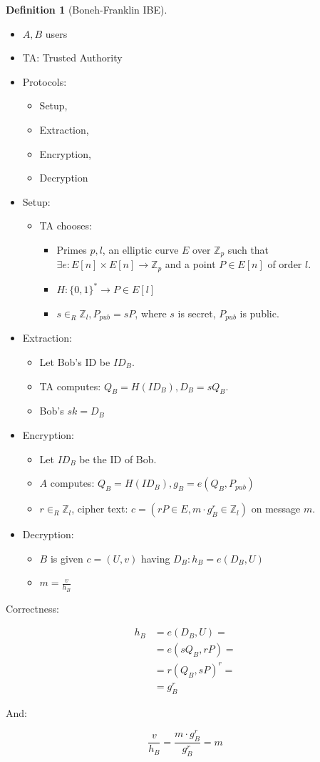 \documentclass[11pt]{article}
\theoremstyle{definition}
\newtheorem{definition}{Definition}[section]
\theoremstyle{proof}
\begin{document}
\begin{definition}[Boneh-Franklin IBE]\leavevmode
	\begin{itemize}
		\item $A, B$ users
		\item TA: Trusted Authority
		\item Protocols:
		\begin{itemize}
			\item Setup,
			\item Extraction,
			\item Encryption,
			\item Decryption
		\end{itemize}
		\item Setup:
		\begin{itemize}
			\item TA chooses:
			\begin{itemize}
				\item Primes $p, l$, an elliptic curve $E$ over $\mathbb{Z}_p$ such that $\exists e: E[n] \times E[n] \rightarrow \mathbb{Z}_p$ and a point $P \in E[n]$ of order $l$.
				\item $H: \{0, 1\}^* \rightarrow P \in E[l]$
				\item $s \in_R \mathbb{Z}_l, P_{pub} = sP$, where $s$ is secret, $P_{pub}$ is public.
			\end{itemize}
		\end{itemize}
		\item Extraction:
		\begin{itemize}
			\item Let Bob's ID be $ID_B$.
			\item TA computes: $Q_B = H(ID_B), D_B = sQ_B$.
			\item Bob's $sk = D_B$
		\end{itemize}
		\item Encryption:
		\begin{itemize}
			\item Let $ID_B$ be the ID of Bob.
			\item $A$ computes: $Q_B = H(ID_B), g_B = e(Q_B, P_{pub})$
			\item $r \in_R \mathbb{Z}_l$, cipher text: $c = (rP \in E, m \cdot g_B^r \in \mathbb{Z}_l)$ on message $m$.
		\end{itemize}
		\item Decryption:
		\begin{itemize}
			\item $B$ is given $c = (U, v)$ having $D_B: h_B = e(D_B, U)$
			\item $m = \frac{v}{h_B}$
		\end{itemize}
	\end{itemize}
\end{definition}

Correctness: 

\begin{align}
	h_B &= e(D_B, U) = \\
	&= e(sQ_B, rP) = \\
	&= r(Q_B, sP)^r = \\
	&= g_B^r
\end{align}

And:

$$
\frac{v}{h_B} = \frac{m \cdot g_B^r}{g_B^r} = m
$$
\end{document}
